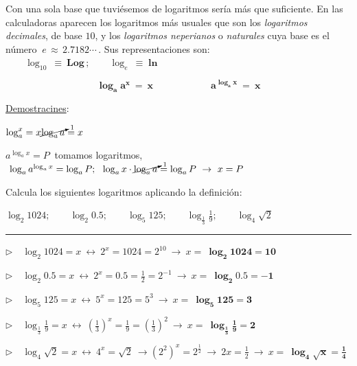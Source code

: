 Con una sola base que tuviésemos de logaritmos sería más que suficiente. En las calculadoras aparecen los logaritmos más usuales que son los \emph{logaritmos decimales}, de base $10$, y los \emph{logaritmos neperianos} o \emph{naturales} cuya base es el número $\ e\,\approx \, 2.7182\cdots\,  $. 
Sus representaciones son: 
$\qquad \log_{10} \ \equiv \ \boldsymbol{ Log} \, ; \qquad  \log_e\ \equiv \boldsymbol{ \ln}$


\vspace{5mm}

\begin{adjustwidth}{100pt}{100pt}
\begin{cuadro-naranja}
$$\boldsymbol{ \log_a a^x\ = \ x \qquad 	 \qquad  \qquad  a^{\log_a x}\ = \ x }$$

\vspace{1mm}
\end{cuadro-naranja}
\end{adjustwidth}

\color{gris}
\underline{Demostracines}:

$\log_a^x=x\cancelto{1}{\log_a a}=x$ \QED

$a^{\log_a x}=P\ $ tomamos logaritmos, $\ \log_a{a^{\log_a x}}=\log_a P;\ \ \log_a x\cdot \cancelto{1}{\log_a a}=\log_a P \ \to \ x=P$ \QED
\color{black}

\vspace{5mm}
\begin{miejercicio}

Calcula los siguientes logaritmos aplicando la definición:

\vspace{2mm} $\log_2 1024; \qquad \log_2 0.5;\qquad \log_5 125;\qquad	 \log_{\frac 1 3}\frac 1 9;\qquad \log_4 \sqrt{2}$

\rule{300pt}{0.1pt}

$\triangleright \quad \log_2 1024=x \ \leftrightarrow \ 2^x=1024=2^{10} \ \to \ x= \ \boldsymbol{ \log_2 1024=10 }$

\vspace{2mm} $\triangleright \quad \log_2 0.5=x \ \leftrightarrow \ 2^x=0.5=\frac 1 2 =2^{-1} \ \to \ x=\ \boldsymbol{\log_2 0.5=-1}$

\vspace{2mm} $\triangleright \quad \log_5 125=x \ \leftrightarrow \ 5^x=125=5^3 \ \to \ x=\ \boldsymbol{\log_5 125=3}$

\vspace{2mm} $\triangleright \quad \log_{\frac 1 3} \frac 1 9 = x \ \leftrightarrow \ \left( \frac 1 3 \right)^x=\frac 1 9 = \left( \frac 1 3 \right)^2 \ \to \ x=\ \boldsymbol {\log_{\frac 1 3} \frac 1 9 = 2}$

\vspace{2mm} $\triangleright \quad \log_4 \sqrt{2}=x \ \leftrightarrow \ 4^x=\sqrt{2} \ \to {(2^2)}^x=2^{\frac 1 2 } \ \to \ 2x=\frac 1 2 \ \to \ x=\ \boldsymbol{\log_4 \sqrt{x}=\frac 1 4}$
\end{miejercicio}


